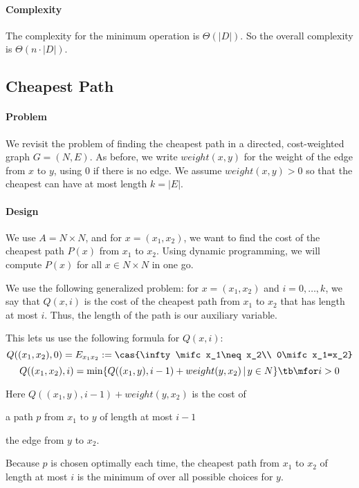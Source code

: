 \paragraph{Complexity}
The complexity for the minimum operation is $\Theta(|D|)$.
So the overall complexity is $\Theta(n\cdot |D|)$.

\subsection{Cheapest Path}

\paragraph{Problem}
We revisit the problem of finding the cheapest path in a directed, cost-weighted graph $G=(N,E)$.
As before, we write $weight(x,y)$ for the weight of the edge from $x$ to $y$, using $0$ if there is no edge.
We assume $weight(x,y)>0$ so that the cheapest can have at most length $k=|E|$.

\paragraph{Design}
We use $A=N\times N$, and for $x=(x_1,x_2)$, we want to find the cost of the cheapest path $P(x)$ from $x_1$ to $x_2$.
Using dynamic programming, we will compute $P(x)$ for all $x\in N\times N$ in one go.

We use the following generalized problem: for $x=(x_1,x_2)$ and $i=0,\ldots,k$, we say that $Q(x,i)$ is the cost of the cheapest path from $x_1$ to $x_2$ that has length at most $i$.
Thus, the length of the path is our auxiliary variable.

This lets us use the following formula for $Q(x,i)$:
\[Q((x_1,x_2),0)=E_{x_1x_2}:=\cas{\infty \mifc x_1\neq x_2\\ 0\mifc x_1=x_2}\]
\[Q((x_1,x_2),i)=\min \{Q((x_1,y),i-1)+weight(y,x_2)\,|\,y\in N\} \tb\mfor i>0\]

Here $Q((x_1,y),i-1)+weight(y,x_2)$ is the cost of
\begin{compactitem}
 \item a path $p$ from $x_1$ to $y$ of length at most $i-1$
 \item the edge from $y$ to $x_2$.
\end{compactitem}
Because $p$ is chosen optimally each time, the cheapest path from $x_1$ to $x_2$ of length at most $i$ is the minimum of over all possible choices for $y$.

